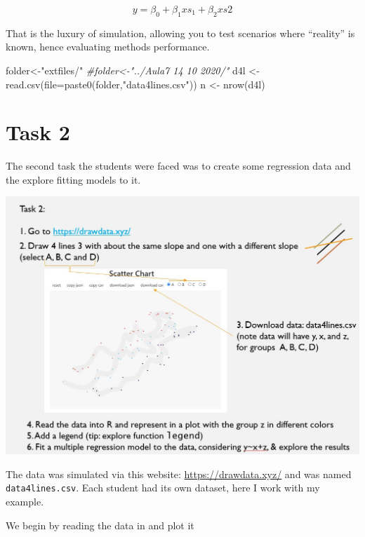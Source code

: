 \documentclass[
]{book}
\newenvironment{Shaded}{\begin{snugshade}}{\end{snugshade}}
\newcommand{\AttributeTok}[1]{\textcolor[rgb]{0.77,0.63,0.00}{#1}}
\newcommand{\CommentTok}[1]{\textcolor[rgb]{0.56,0.35,0.01}{\textit{#1}}}
\newcommand{\FunctionTok}[1]{\textcolor[rgb]{0.00,0.00,0.00}{#1}}
\newcommand{\NormalTok}[1]{#1}
\newcommand{\OtherTok}[1]{\textcolor[rgb]{0.56,0.35,0.01}{#1}}
\newcommand{\StringTok}[1]{\textcolor[rgb]{0.31,0.60,0.02}{#1}}
\begin{document}
\[y=\beta_0+\beta_1 xs_1+\beta_2 xs2\]

That is the luxury of simulation, allowing you to test scenarios where ``reality'' is known, hence evaluating methods performance.

\begin{Shaded}
\begin{Highlighting}[]
\NormalTok{folder}\OtherTok{\textless{}{-}}\StringTok{"extfiles/"}
\CommentTok{\#folder\textless{}{-}"../Aula7 14 10 2020/"}
\NormalTok{d4l }\OtherTok{\textless{}{-}} \FunctionTok{read.csv}\NormalTok{(}\AttributeTok{file=}\FunctionTok{paste0}\NormalTok{(folder,}\StringTok{"data4lines.csv"}\NormalTok{))}
\NormalTok{n }\OtherTok{\textless{}{-}} \FunctionTok{nrow}\NormalTok{(d4l)}
\end{Highlighting}
\end{Shaded}

\hypertarget{task-2}{%
\section{Task 2}\label{task-2}}

The second task the students were faced was to create some regression data and the explore fitting models to it.

\includegraphics{extfiles/Aula7Task7.JPG}

The data was simulated via this website: \url{https://drawdata.xyz/} and was named \texttt{data4lines.csv}. Each student had its own dataset, here I work with my example.

We begin by reading the data in and plot it
\end{document}
